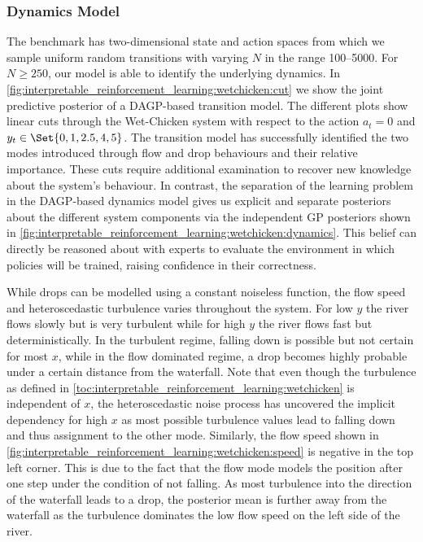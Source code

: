\subsubsection{Dynamics Model}
\label{toc:interpretable_rl:dynamics_model}
The benchmark has two-dimensional state and action spaces from which we sample uniform random transitions with varying $N$ in the range \numrange{100}{5000}.
For $N \geq 250$, our model is able to identify the underlying dynamics.
In \cref{fig:interpretable_reinforcement_learning:wetchicken:cut} we show the joint predictive posterior of a DAGP-based transition model.
The different plots show linear cuts through the Wet-Chicken system with respect to the action $a_t = 0$ and $y_t \in \Set{0, 1, 2.5, 4, 5}$.
The transition model has successfully identified the two modes introduced through flow and drop behaviours and their relative importance.
These cuts require additional examination to recover new knowledge about the system's behaviour.
In contrast, the separation of the learning problem in the DAGP-based dynamics model gives us explicit and separate posteriors about the different system components via the independent GP posteriors shown in \cref{fig:interpretable_reinforcement_learning:wetchicken:dynamics}.
This belief can directly be reasoned about with experts to evaluate the environment in which policies will be trained, raising confidence in their correctness.

While drops can be modelled using a constant noiseless function, the flow speed and heteroscedastic turbulence varies throughout the system.
For low $y$ the river flows slowly but is very turbulent while for high $y$ the river flows fast but deterministically.
In the turbulent regime, falling down is possible but not certain for most $x$, while in the flow dominated regime, a drop becomes highly probable under a certain distance from the waterfall.
Note that even though the turbulence as defined in \cref{toc:interpretable_reinforcement_learning:wetchicken} is independent of $x$, the heteroscedastic noise process has uncovered the implicit dependency for high $x$ as most possible turbulence values lead to falling down and thus assignment to the other mode.
Similarly, the flow speed shown in \cref{fig:interpretable_reinforcement_learning:wetchicken:speed} is negative in the top left corner.
This is due to the fact that the flow mode models the position after one step under the condition of not falling.
As most turbulence into the direction of the waterfall leads to a drop, the posterior mean is further away from the waterfall as the turbulence dominates the low flow speed on the left side of the river.


